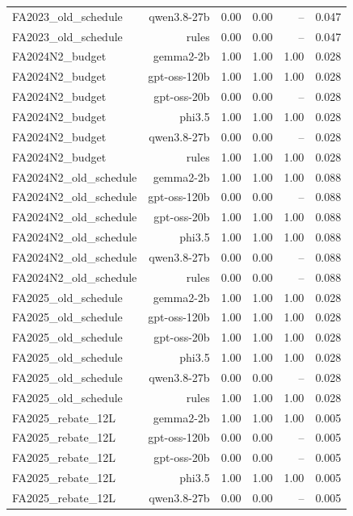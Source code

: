 \begin{table}[t]
\begin{tabular}{lrrrrr}
FA2023\_old\_schedule & qwen3.8-27b & 0.00 & 0.00 & -- & 0.047 \\
FA2023\_old\_schedule & rules & 0.00 & 0.00 & -- & 0.047 \\
FA2024N2\_budget & gemma2-2b & 1.00 & 1.00 & 1.00 & 0.028 \\
FA2024N2\_budget & gpt-oss-120b & 1.00 & 1.00 & 1.00 & 0.028 \\
FA2024N2\_budget & gpt-oss-20b & 0.00 & 0.00 & -- & 0.028 \\
FA2024N2\_budget & phi3.5 & 1.00 & 1.00 & 1.00 & 0.028 \\
FA2024N2\_budget & qwen3.8-27b & 0.00 & 0.00 & -- & 0.028 \\
FA2024N2\_budget & rules & 1.00 & 1.00 & 1.00 & 0.028 \\
FA2024N2\_old\_schedule & gemma2-2b & 1.00 & 1.00 & 1.00 & 0.088 \\
FA2024N2\_old\_schedule & gpt-oss-120b & 0.00 & 0.00 & -- & 0.088 \\
FA2024N2\_old\_schedule & gpt-oss-20b & 1.00 & 1.00 & 1.00 & 0.088 \\
FA2024N2\_old\_schedule & phi3.5 & 1.00 & 1.00 & 1.00 & 0.088 \\
FA2024N2\_old\_schedule & qwen3.8-27b & 0.00 & 0.00 & -- & 0.088 \\
FA2024N2\_old\_schedule & rules & 0.00 & 0.00 & -- & 0.088 \\
FA2025\_old\_schedule & gemma2-2b & 1.00 & 1.00 & 1.00 & 0.028 \\
FA2025\_old\_schedule & gpt-oss-120b & 1.00 & 1.00 & 1.00 & 0.028 \\
FA2025\_old\_schedule & gpt-oss-20b & 1.00 & 1.00 & 1.00 & 0.028 \\
FA2025\_old\_schedule & phi3.5 & 1.00 & 1.00 & 1.00 & 0.028 \\
FA2025\_old\_schedule & qwen3.8-27b & 0.00 & 0.00 & -- & 0.028 \\
FA2025\_old\_schedule & rules & 1.00 & 1.00 & 1.00 & 0.028 \\
FA2025\_rebate\_12L & gemma2-2b & 1.00 & 1.00 & 1.00 & 0.005 \\
FA2025\_rebate\_12L & gpt-oss-120b & 0.00 & 0.00 & -- & 0.005 \\
FA2025\_rebate\_12L & gpt-oss-20b & 0.00 & 0.00 & -- & 0.005 \\
FA2025\_rebate\_12L & phi3.5 & 1.00 & 1.00 & 1.00 & 0.005 \\
FA2025\_rebate\_12L & qwen3.8-27b & 0.00 & 0.00 & -- & 0.005 \\

\end{tabular}
\end{table}
